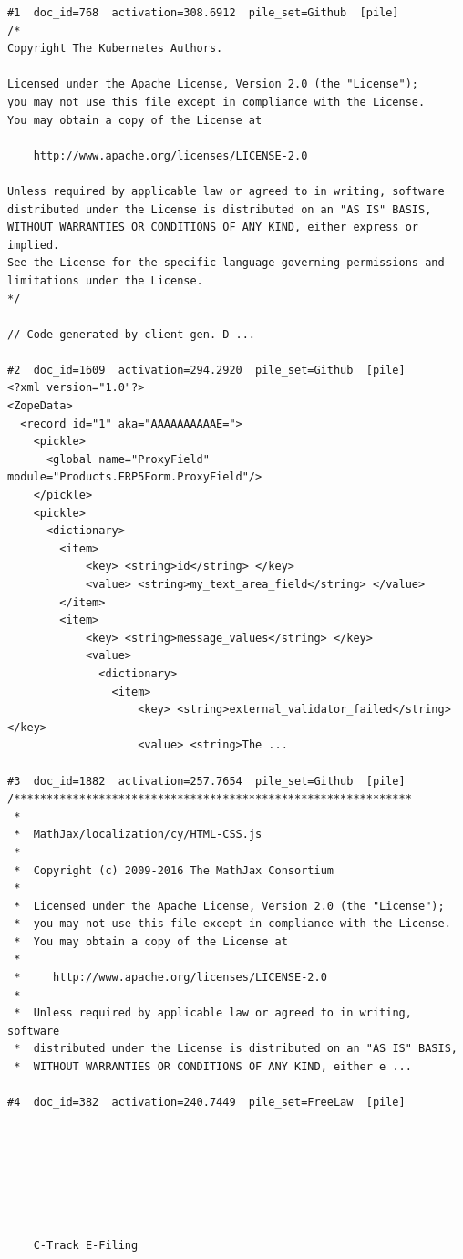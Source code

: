\begin{verbatim}
#1  doc_id=768  activation=308.6912  pile_set=Github  [pile]
/*
Copyright The Kubernetes Authors.

Licensed under the Apache License, Version 2.0 (the "License");
you may not use this file except in compliance with the License.
You may obtain a copy of the License at

    http://www.apache.org/licenses/LICENSE-2.0

Unless required by applicable law or agreed to in writing, software
distributed under the License is distributed on an "AS IS" BASIS,
WITHOUT WARRANTIES OR CONDITIONS OF ANY KIND, either express or implied.
See the License for the specific language governing permissions and
limitations under the License.
*/

// Code generated by client-gen. D ...

#2  doc_id=1609  activation=294.2920  pile_set=Github  [pile]
<?xml version="1.0"?>
<ZopeData>
  <record id="1" aka="AAAAAAAAAAE=">
    <pickle>
      <global name="ProxyField" module="Products.ERP5Form.ProxyField"/>
    </pickle>
    <pickle>
      <dictionary>
        <item>
            <key> <string>id</string> </key>
            <value> <string>my_text_area_field</string> </value>
        </item>
        <item>
            <key> <string>message_values</string> </key>
            <value>
              <dictionary>
                <item>
                    <key> <string>external_validator_failed</string> </key>
                    <value> <string>The ...

#3  doc_id=1882  activation=257.7654  pile_set=Github  [pile]
/*************************************************************
 *
 *  MathJax/localization/cy/HTML-CSS.js
 *
 *  Copyright (c) 2009-2016 The MathJax Consortium
 *
 *  Licensed under the Apache License, Version 2.0 (the "License");
 *  you may not use this file except in compliance with the License.
 *  You may obtain a copy of the License at
 *
 *     http://www.apache.org/licenses/LICENSE-2.0
 *
 *  Unless required by applicable law or agreed to in writing, software
 *  distributed under the License is distributed on an "AS IS" BASIS,
 *  WITHOUT WARRANTIES OR CONDITIONS OF ANY KIND, either e ...

#4  doc_id=382  activation=240.7449  pile_set=FreeLaw  [pile]



    



	C-Track E-Filing
	

\end{verbatim}
